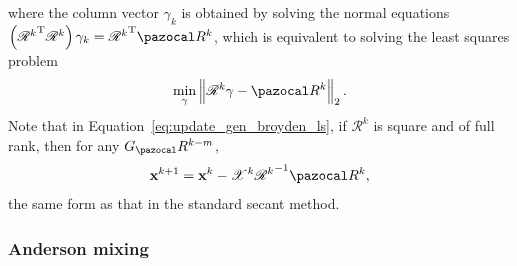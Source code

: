 where the column vector \(\gamma_{k}\) is obtained by solving the normal equations \(\left({\mathscr{R}^{k}}^{\mathrm{T}} \mathscr{R}^{k}\right) \gamma_{k}={\mathscr{R}^{k}}^{\mathrm{T}} \pazocal R^{k}\), which is equivalent to solving the least squares problem
\begin{equation}
  \min _{\gamma}\left\|\mathscr{R}^{k} \gamma-\pazocal R^{k}\right\|_{2}.
\end{equation}
Note that in Equation~\eqref{eq:update_gen_broyden_ls}, if \(\mathscr{R}^{k}\) is square and of full rank, then for any \(G_\pazocal R^{k-m}\),
\begin{equation}
  \mathbf x^{k+1}=\mathbf x^{k}-\mathscr{X}^{k} {\mathscr{R}^{k}}^{-1} \pazocal R^{k},
\end{equation}
the same form as that in the standard secant method.

\subsubsection{Anderson mixing}


